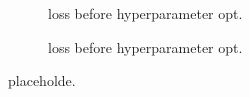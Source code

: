 \begin{figure}[H]
    \centering
    \begin{subfigure}{0.49\textwidth}
        \centering
        \caption{loss before hyperparameter opt.}
    \end{subfigure}
    \hfill
    \begin{subfigure}{0.49\textwidth}
        \centering
        \caption{loss before hyperparameter opt.}
    \end{subfigure}
    \caption{placeholde.}
    \label{fig:comp3}
\end{figure}
\noindent
